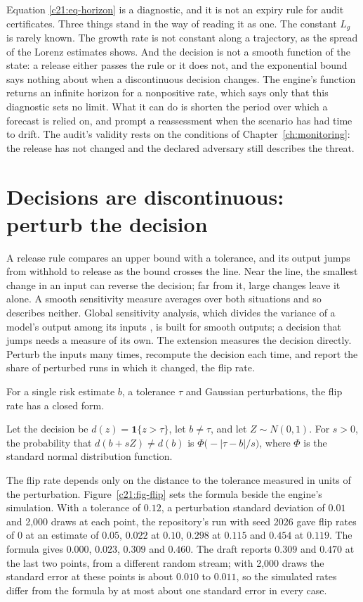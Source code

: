 Equation \eqref{c21:eq-horizon} is a diagnostic, and it is not an expiry rule for audit certificates. Three
things stand in the way of reading it as one. The constant $L_g$ is rarely known. The growth rate is
not constant along a trajectory, as the spread of the Lorenz estimates shows. And the decision is not
a smooth function of the state: a release either passes the rule or it does not, and the exponential
bound says nothing about when a discontinuous decision changes. The engine's function returns an
infinite horizon for a nonpositive rate, which says only that this diagnostic sets no limit. What it
can do is shorten the period over which a forecast is relied on, and prompt a reassessment when the
scenario has had time to drift. The audit's validity rests on the conditions of Chapter~\ref{ch:monitoring}: the
release has not changed and the declared adversary still describes the threat.

\section{Decisions are discontinuous: perturb the decision}

A release rule compares an upper bound with a tolerance, and its output jumps from withhold to
release as the bound crosses the line. Near the line, the smallest change in an input can reverse
the decision; far from it, large changes leave it alone. A smooth sensitivity measure averages over
both situations and so describes neither. Global sensitivity analysis, which divides the variance of
a model's output among its inputs \citep{sobol2001,saltelli2007}, is built for smooth outputs; a
decision that jumps needs a measure of its own. The extension measures the decision directly. Perturb
the inputs many times, recompute the decision each time, and report the share of perturbed runs in
which it changed, the flip rate.

For a single risk estimate $b$, a tolerance $\tau$ and Gaussian perturbations, the flip rate has a
closed form.

\begin{proposition}\label{c21:prop-flip}
Let the decision be $d(z)=\mathbf 1\{z>\tau\}$, let $b\ne\tau$, and let $Z\sim N(0,1)$. For $s>0$, the
probability that $d(b+sZ)\ne d(b)$ is $\Phi\big(-|\tau-b|/s\big)$, where $\Phi$ is the standard normal
distribution function.
\end{proposition}

The flip rate depends only on the distance to the tolerance measured in units of the perturbation.
Figure~\ref{c21:fig-flip} sets the formula beside the engine's simulation. With a tolerance of $0.12$, a perturbation
standard deviation of $0.01$ and 2,000 draws at each point, the repository's run with seed 2026 gave
flip rates of 0 at an estimate of $0.05$, $0.022$ at $0.10$, $0.298$ at $0.115$ and $0.454$ at $0.119$. The formula gives
$0.000$, $0.023$, $0.309$ and $0.460$. The draft reports $0.309$ and $0.470$ at the last two points, from a different
random stream; with 2,000 draws the standard error at these points is about $0.010$ to $0.011$, so
the simulated rates differ from the formula by at most about one standard error in every case.

